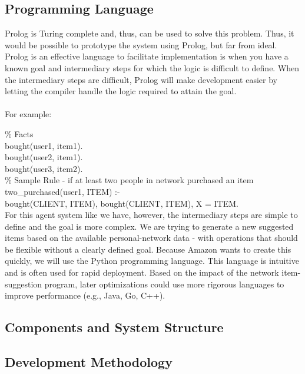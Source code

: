 \documentclass[12pt,a4paper]{article}
\newcommand\tab[1][1cm]{\hspace*{#1}}
\begin{document}
	\subsection*{Programming Language}
		Prolog is Turing complete and, thus, can be used to solve this problem. Thus, it would be possible to prototype the system using Prolog, but far from ideal. Prolog is an effective language to facilitate implementation is when you have a known goal and intermediary steps for which the logic is difficult to define. When the intermediary steps are difficult, Prolog will make development easier by letting the compiler handle the logic required to attain the goal. 
		\\\\
		For example:
		
		\% Facts\\
		\tab bought(user1, item1).\\
		\tab bought(user2, item1).\\
		\tab bought(user3, item2).\\
		
		\% Sample Rule - if at least two people in network purchased an item \\
		\tab two\_purchased(user1, ITEM) :- \\
		\tab \tab bought(CLIENT, ITEM), bought(CLIENT, ITEM), X = ITEM.\\
		
		For this agent system like we have, however, the intermediary steps are simple to define and the goal is more complex. We are trying to generate a new suggested items based on the available personal-network data - with operations that should be flexible without a clearly defined goal. Because Amazon wants to create this quickly, we will use the Python programming language. This language is intuitive and is often used for rapid deployment. Based on the impact of the network item-suggestion program, later optimizations could use more rigorous languages to improve performance (e.g., Java, Go, C++).
		
		
		\subsection*{Components and System Structure}
		
		
		
		
		
		\subsection*{Development Methodology}
		
\end{document}
